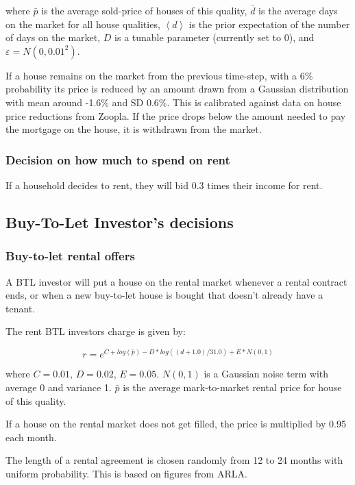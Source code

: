 \documentclass{article}
\begin{document}
\bigskip

where $\bar{p}$ is the average sold-price of houses of this quality, $\bar{d}
$ is the average days on the market for all house qualities, $\left\langle
d\right\rangle $ is the prior expectation of the number of days on the
market, $D$ is a tunable parameter (currently set to 0), and $\varepsilon
=N(0,0.01^{2})$.

If a house remains on the market from the previous time-step, with a 6\%
probability its price is reduced by an amount drawn from a Gaussian
distribution with mean around -1.6\% and SD 0.6\%. This is calibrated
against data on house price reductions from Zoopla. If the price drops below the amount needed to pay the mortgage on the house, it is withdrawn from the
market.

\subsubsection{Decision on how much to spend on rent}
If a household decides to rent, they will bid 0.3 times their income for rent.

\subsection{Buy-To-Let Investor's decisions}
\subsubsection{Buy-to-let rental offers}
A BTL investor will put a house on the rental market
whenever a rental contract ends, or when a new buy-to-let house is bought
that doesn't already have a tenant. 

The rent BTL investors charge is given by:

\begin{equation}
r=e^{C+log(\bar{p})-D\ast log((d+1.0)/31.0)+E\ast N(0,1)}
\end{equation}

\bigskip

where $C=0.01$, $D=0.02$, $E=0.05$. $N(0,1)$ is a Gaussian noise term with
average 0 and variance 1. $\bar{p}$ is the average mark-to-market rental
price for house of this quality.

If a house on the rental market does not get filled, the price is multiplied by 0.95 each month.

The length of a rental agreement is
chosen randomly from 12 to 24 months with uniform probability. This is based
on figures from ARLA.
\end{document}
